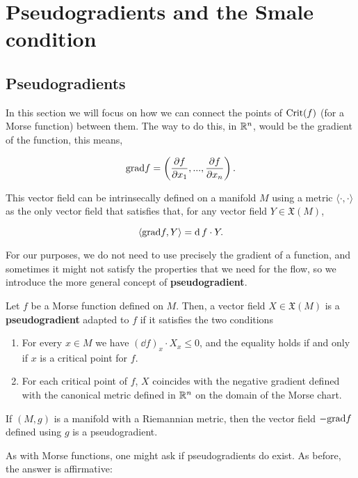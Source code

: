 \section{Pseudogradients and the Smale condition} \label{section:pseudogradients}

\subsection{Pseudogradients}

In this section we will focus on how we can connect the points of $\text{Crit}(f)$ (for a Morse function) between them. The way to do this, in $\mathbb{R}^n$, would be the gradient of the function, this means,

$$\text{grad} f = \left( \frac{\partial f}{\partial x_1},...,\frac{\partial f}{\partial x_n} \right) .$$

This vector field can be intrinsecally defined on a manifold $M$ using a metric $\langle \cdot , \cdot \rangle$ as the only vector field that satisfies that, for any vector field $Y \in \mathfrak{X}(M)$,

$$\langle \text{grad} f, Y \rangle = \operatorname d f \cdot Y .$$

For our purposes, we do not need to use precisely the gradient of a function, and sometimes it might not satisfy the properties that we need for the flow, so we introduce the more general concept of {\bf pseudogradient}.

\begin{deff}
Let $f$ be a Morse function defined on $M$. Then, a vector field $X \in \mathfrak{X}(M)$ is a {\bf pseudogradient} adapted to $f$ if it satisfies the two conditions

\begin{enumerate}
\item For every $x \in M$ we have $(\dd f)_x \cdot X_x \leq 0$, and the equality holds if and only if $x$ is a critical point for $f$.
\item For each critical point of $f$, $X$ coincides with the negative gradient defined with the canonical metric defined in $\mathbb{R}^n$ on the domain of the Morse chart.
\end{enumerate}
\end{deff}

\begin{rmrk}
If $(M,g)$ is a manifold with a Riemannian metric, then the vector field $- \text{grad} f$ defined using $g$ is a pseudogradient.
\end{rmrk}

As with Morse functions, one might ask if pseudogradients do exist. As before, the answer is affirmative:

